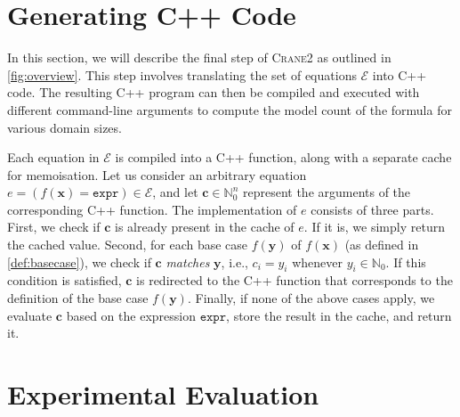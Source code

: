\documentclass{article}
\theoremstyle{remark}
\newcommand{\expr}{\mathtt{expr}}
\newcommand{\Cranetwo}{\textsc{Crane2}}
\begin{document}
\section{Generating C++ Code}\label{sec:cpp}

In this section, we will describe the final step of \Cranetwo{} as outlined in
\cref{fig:overview}. This step involves translating the set of equations
$\mathcal{E}$ into C++ code. The resulting C++ program can then be compiled and
executed with different command-line arguments to compute the model count of the
formula for various domain sizes.

Each equation in $\mathcal{E}$ is compiled into a C++ function, along with a
separate cache for memoisation. Let us consider an arbitrary equation
$e = (f(\mathbf{x}) = \expr{}) \in \mathcal{E}$, and let
$\mathbf{c} \in \mathbb{N}_{0}^{n}$ represent the arguments of the corresponding
C++ function. The implementation of $e$ consists of three parts. First, we check
if $\mathbf{c}$ is already present in the cache of $e$. If it is, we simply
return the cached value. Second, for each base case $f(\mathbf{y})$ of
$f(\mathbf{x})$ (as defined in \cref{def:basecase}), we check if $\mathbf{c}$
\emph{matches} $\mathbf{y}$, i.e., $c_{i} = y_{i}$ whenever
$y_{i} \in \mathbb{N}_{0}$. If this condition is satisfied, $\mathbf{c}$ is
redirected to the C++ function that corresponds to the definition of the base
case $f(\mathbf{y})$. Finally, if none of the above cases apply, we evaluate
$\mathbf{c}$ based on the expression $\expr{}$, store the result in the cache,
and return it.

\section{Experimental Evaluation}\label{sec:experiments}



\end{document}
